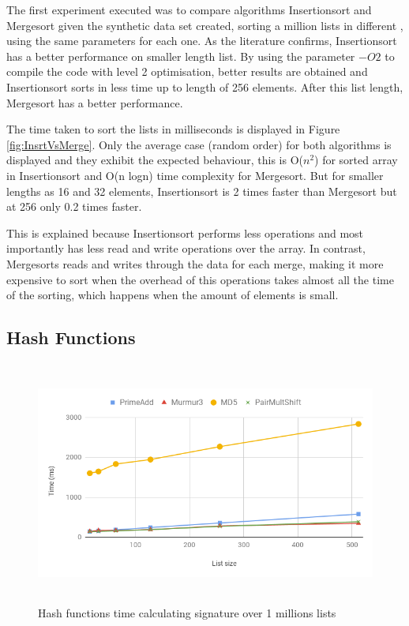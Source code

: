 \documentclass[a4paper,12pt]{article}
\begin{document}
The first experiment executed was to compare algorithms Insertionsort and Mergesort given the synthetic data set created, sorting a million lists in different , using the same parameters for each one. As the literature confirms, Insertionsort has a better performance on smaller length list. By using the parameter $-O2$ to compile the code with level 2 optimisation, better results are obtained and Insertionsort sorts in less time up to length of 256 elements. After this list length, Mergesort has a better performance.

The time taken to sort the lists in milliseconds is displayed in Figure \ref{fig:InsrtVsMerge}. Only the average case (random order) for both algorithms is displayed and they exhibit the expected behaviour, this is  O(${n}^2$) for sorted array in Insertionsort and O(n logn) time complexity for Mergesort.  But for smaller lengths as 16 and 32 elements, Insertionsort is 2 times faster than Mergesort but at 256 only 0.2 times faster. 

This is explained because Insertionsort performs less operations and most importantly has less read and write operations over the array. In contrast, Mergesorts reads and writes through the data for each merge, making it more expensive to sort when the overhead of this operations takes almost all the time of the sorting, which happens when the amount of elements is small.

\subsection{Hash Functions}

\begin{figure}[H]
    \centering
    \includegraphics[height=8cm,keepaspectratio]{./images/hashes.png}
    \caption{Hash functions time calculating signature over 1 millions lists}
    \label{fig:HashesFunc}
\end{figure}
\end{document}
